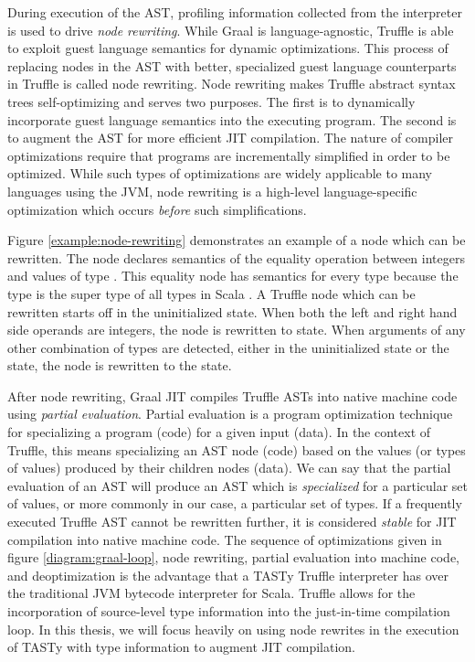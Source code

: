 During execution of the AST, profiling information collected from the interpreter is used to drive \textit{node rewriting}.
While Graal is language-agnostic, Truffle is able to exploit guest language semantics for dynamic optimizations.
This process of replacing nodes in the AST with better, specialized guest language counterparts in Truffle is called node rewriting.
Node rewriting makes Truffle abstract syntax trees self-optimizing and serves two purposes.
The first is to dynamically incorporate guest language semantics into the executing program.
The second is to augment the AST for more efficient JIT compilation.
The nature of compiler optimizations require that programs are incrementally simplified in order to be optimized.
While such types of optimizations are widely applicable to many languages using the JVM, node rewriting is a high-level language-specific optimization which occurs \textit{before} such simplifications.

Figure \ref{example:node-rewriting} demonstrates an example of a node which can be rewritten.
The node declares semantics of the equality operation between integers and values of type .
This equality node has semantics for every type because the  type is the super type of all types in Scala .
A Truffle node which can be rewritten starts off in the uninitialized state.
When both the left and right hand side operands are integers, the node is rewritten to  state.
When arguments of any other combination of types are detected, either in the uninitialized state or the  state, the node is rewritten to the  state.

After node rewriting, Graal JIT compiles Truffle ASTs into native machine code using \textit{partial evaluation}.
Partial evaluation is a program optimization technique for specializing a program (code) for a given input (data)\cite{futamura:partial-eval}.
In the context of Truffle, this means specializing an AST node (code) based on the values (or types of values) produced by their children nodes (data)\cite{truffle:partial-eval}.
We can say that the partial evaluation of an AST  will produce an AST which is \textit{specialized} for a particular set of values, or more commonly in our case, a particular set of types.
If a frequently executed Truffle AST cannot be rewritten further, it is considered \textit{stable} for JIT compilation into native machine code.  
The sequence of optimizations given in figure \ref{diagram:graal-loop}, node rewriting, partial evaluation into machine code, and deoptimization is the advantage that a TASTy Truffle interpreter has over the traditional JVM bytecode interpreter for Scala.
Truffle allows for the incorporation of source-level type information into the just-in-time compilation loop.
In this thesis, we will focus heavily on using node rewrites in the execution of TASTy with type information to augment JIT compilation.

